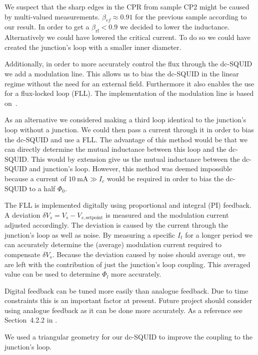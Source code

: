 We suspect that the sharp edges in the CPR from sample CP2 might be caused by multi-valued measurements. $\beta_{rf}\approx 0.91$ for the previous sample according to our result. In order to get a $\beta_{\text{rf}} < 0.9$ we decided to lower the inductance. Alternatively we could have lowered the critical current. To do so we could have created the junction's loop with a smaller inner diameter. 

Additionally, in order to more accurately control the flux through the dc-SQUID we add a modulation line. This allows us to bias the dc-SQUID in the linear regime without the need for an external field. Furthermore it also enables the use for a flux-locked loop (FLL). The implementation of the modulation line is based on~\cite{linYBaCuNano2020}.

As an alternative we considered making a third loop identical to the junction's loop without a junction. We could then pass a current through it in order to bias the dc-SQUID and use a FLL. The advantage of this method would be that we can directly determine the mutual inductance between this loop and the dc-SQUID. This would by extension give us the mutual inductance between the dc-SQUID and junction's loop. However, this method was deemed impossible because a current of $\qty{10}{\milli\ampere} \gg I_c$ would be required in order to bias the dc-SQUID to a half $\Phi_0$.

The FLL is implemented digitally using proportional and integral (PI) feedback. A deviation $\delta V_s = V_s - V_{s,\text{setpoint}}$ is measured and the modulation current adjusted accordingly. The deviation is caused by the current through the junction's loop as well as noise. By measuring a specific $I_t$ for a longer period we can accurately determine the (average) modulation current required to compensate $\delta V_s$. Because the deviation caused by noise should average out, we are left with the contribution of just the junction's loop coupling. This averaged value can be used to determine $\Phi_l$ more accurately.

Digital feedback can be tuned more easily than analogue feedback. Due to time constraints this is an important factor at present. Future project should consider using analogue feedback as it can be done more accurately. As a reference see Section~4.2.2 in \cite{zhangSQUIDReadoutElectronics2020}.

We used a triangular geometry for our dc-SQUID to improve the coupling to the junction's loop.

